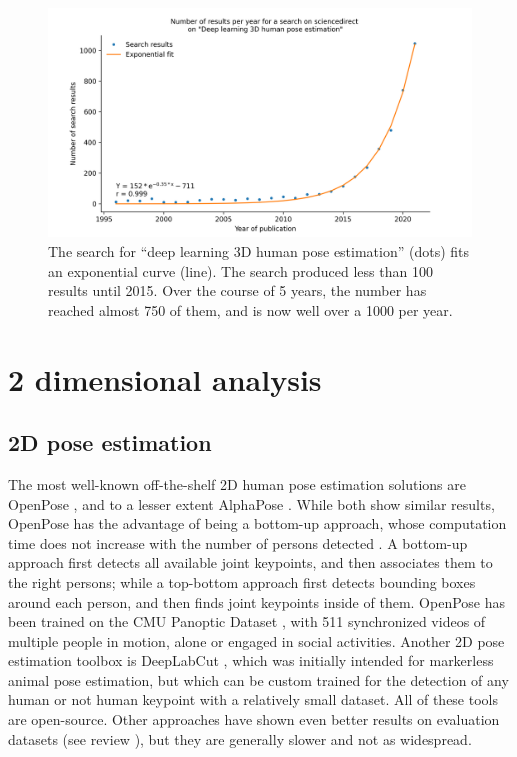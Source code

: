 \begin{figure}[hbtp]
	\centering
	\def\svgwidth{1\columnwidth}
	\fontsize{10pt}{10pt}\selectfont
	\includegraphics[width=\linewidth]{"../Chap1/Figure/Fig_exp.png"}
	\caption{The search for “deep learning 3D human pose estimation” (dots) fits an exponential curve (line). The search produced less than 100 results until 2015. Over the course of 5 years, the number has reached almost 750 of them, and is now well over a 1000 per year.}
	\label{fig_exp}
\end{figure}
\FloatBarrier

\section{2 dimensional analysis}

\subsection{2D pose estimation}

The most well-known off-the-shelf 2D human pose estimation solutions are OpenPose \cite{Cao2019}, and to a lesser extent AlphaPose \cite{Fang2017}. While both show similar results, OpenPose has the advantage of being a bottom-up approach, whose computation time does not increase with the number of persons detected \cite{Cao2019}. A bottom-up approach first detects all available joint keypoints, and then associates them to the right persons; while a top-bottom approach first detects bounding boxes around each person, and then finds joint keypoints inside of them. OpenPose has been trained on the CMU Panoptic Dataset \cite{Joo2015}, with 511 synchronized videos of multiple people in motion, alone or engaged in social activities. Another 2D pose estimation toolbox is DeepLabCut \cite{Mathis2018}, which was initially intended for markerless animal pose estimation, but which can be custom trained for the detection of any human or not human keypoint with a relatively small dataset. All of these tools are open-source. Other approaches have shown even better results on evaluation datasets (see review \cite{Chen2020}), but they are generally slower and not as widespread.

